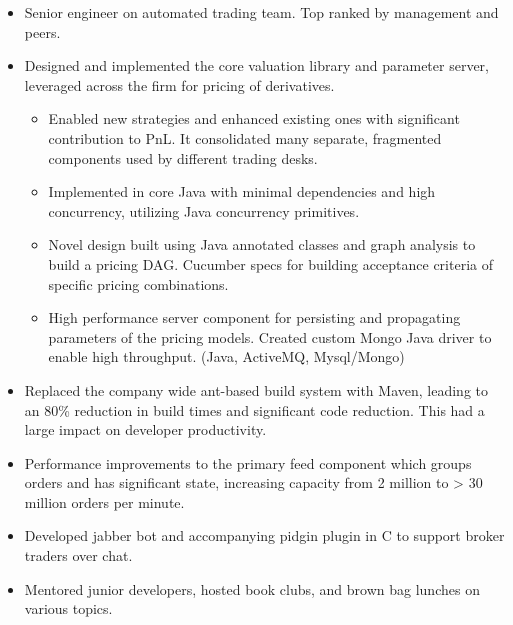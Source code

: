 \documentclass[11pt,a4paper,roman]{moderncv}
\begin{document}
\vspace{5mm}

\begin{itemize}
\item Senior engineer on automated trading team. Top ranked by management and peers.
\item Designed and implemented the core valuation library and parameter server, leveraged across the firm for pricing of derivatives.
  \begin{itemize}
    \item Enabled new strategies and enhanced existing ones with significant contribution to PnL. It
          consolidated many separate, fragmented components used by different trading desks.
    \item Implemented in core Java with minimal dependencies and high concurrency, utilizing Java
          concurrency primitives.
    \item Novel design built using Java annotated classes and graph analysis to build a pricing DAG.\@
          Cucumber specs for building acceptance criteria of specific pricing combinations.
    \item High performance server component for persisting and propagating parameters of the pricing models.
          Created custom Mongo Java driver to enable high throughput. (Java, ActiveMQ, Mysql/Mongo)
  \end{itemize}
  \item Replaced the company wide ant-based build system with Maven, leading to an 80\%
        reduction in build times and significant code reduction. This had a large impact on developer
        productivity.
  \item Performance improvements to the primary feed component which groups orders and has significant
        state, increasing capacity from 2 million to \textgreater{} 30 million orders per minute.
\item Developed jabber bot and accompanying pidgin plugin in C to support broker traders over chat.
\item Mentored junior developers, hosted book clubs, and brown bag lunches on various topics.
\end{itemize}

\vspace{5mm}
\end{document}
